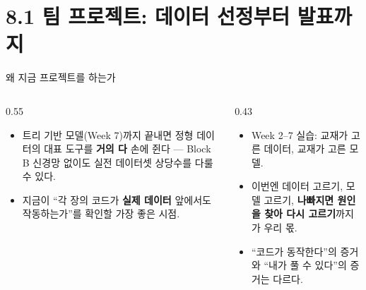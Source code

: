 \section{8.1 팀 프로젝트: 데이터 선정부터 발표까지}
\begin{frame}{왜 지금 프로젝트를 하는가}
  \begin{columns}[T]
    \begin{column}{0.55\textwidth}
      \begin{itemize}
        \item 트리 기반 모델(Week 7)까지 끝내면 정형 데이터의
          대표 도구를 \textbf{거의 다} 손에 쥔다 --- Block B 신경망
          없이도 실전 데이터셋 상당수를 다룰 수 있다.
        \item 지금이 ``각 장의 코드가 \textbf{실제 데이터} 앞에서도
          작동하는가''를 확인할 가장 좋은 시점.
      \end{itemize}
    \end{column}
    \begin{column}{0.43\textwidth}
      \begin{itemize}
        \item Week 2--7 실습: 교재가 고른 데이터, 교재가 고른 모델.
        \item 이번엔 데이터 고르기, 모델 고르기, \textbf{나빠지면
          원인을 찾아 다시 고르기}까지가 우리 몫.
        \item ``코드가 동작한다''의 증거와 ``내가 풀 수 있다''의
          증거는 다르다.
      \end{itemize}
    \end{column}
  \end{columns}
\end{frame}
